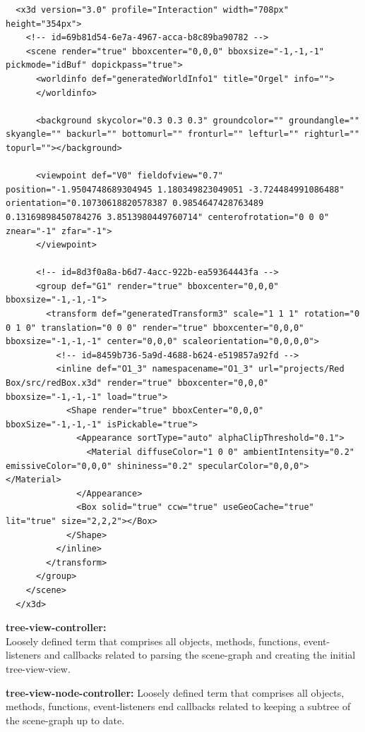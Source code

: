 \begin{verbatim}
  <x3d version="3.0" profile="Interaction" width="708px" height="354px">
    <!-- id=69b81d54-6e7a-4967-acca-b8c89ba90782 -->
    <scene render="true" bboxcenter="0,0,0" bboxsize="-1,-1,-1" pickmode="idBuf" dopickpass="true">
      <worldinfo def="generatedWorldInfo1" title="Orgel" info="">
      </worldinfo>

      <background skycolor="0.3 0.3 0.3" groundcolor="" groundangle="" skyangle="" backurl="" bottomurl="" fronturl="" lefturl="" righturl="" topurl=""></background>

      <viewpoint def="V0" fieldofview="0.7" position="-1.9504748689304945 1.180349823049051 -3.724484991086488" orientation="0.10730618820578387 0.9854647428763489 0.13169898450784276 3.8513980449760714" centerofrotation="0 0 0" znear="-1" zfar="-1">
      </viewpoint>

      <!-- id=8d3f0a8a-b6d7-4acc-922b-ea59364443fa -->
      <group def="G1" render="true" bboxcenter="0,0,0" bboxsize="-1,-1,-1">
        <transform def="generatedTransform3" scale="1 1 1" rotation="0 0 1 0" translation="0 0 0" render="true" bboxcenter="0,0,0" bboxsize="-1,-1,-1" center="0,0,0" scaleorientation="0,0,0,0">
          <!-- id=8459b736-5a9d-4688-b624-e519857a92fd -->
          <inline def="O1_3" namespacename="O1_3" url="projects/Red Box/src/redBox.x3d" render="true" bboxcenter="0,0,0" bboxsize="-1,-1,-1" load="true">
            <Shape render="true" bboxCenter="0,0,0" bboxSize="-1,-1,-1" isPickable="true">
              <Appearance sortType="auto" alphaClipThreshold="0.1">
                <Material diffuseColor="1 0 0" ambientIntensity="0.2" emissiveColor="0,0,0" shininess="0.2" specularColor="0,0,0"></Material>
              </Appearance>
              <Box solid="true" ccw="true" useGeoCache="true" lit="true" size="2,2,2"></Box>
            </Shape>
          </inline>
        </transform>
      </group>
    </scene>
  </x3d>
\end{verbatim}


\textbf{tree-view-controller:}\\
Loosely defined term that comprises all objects, methods, functions,
event-listeners and callbacks related to parsing the scene-graph and
creating the initial tree-view-view.

\textbf{tree-view-node-controller:} Loosely defined term that comprises
all objects, methods, functions, event-listeners end callbacks related
to keeping a subtree of the scene-graph up to date.

